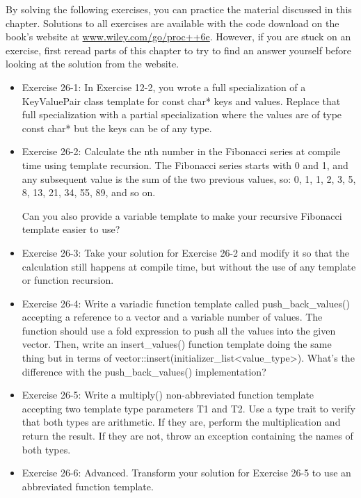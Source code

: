 By solving the following exercises, you can practice the material discussed in this chapter. Solutions to all exercises are available with the code download on the book’s website at \url{www.wiley.com/go/proc++6e}. However, if you are stuck on an exercise, first reread parts of this chapter to try to find an answer yourself before looking at the solution from the website.

\begin{itemize}
\item
Exercise 26-1: In Exercise 12-2, you wrote a full specialization of a KeyValuePair class template for const char* keys and values. Replace that full specialization with a partial specialization where the values are of type const char* but the keys can be of any type.

\item
Exercise 26-2: Calculate the nth number in the Fibonacci series at compile time using template recursion. The Fibonacci series starts with 0 and 1, and any subsequent value is the sum of the two previous values, so: 0, 1, 1, 2, 3, 5, 8, 13, 21, 34, 55, 89, and so on.

Can you also provide a variable template to make your recursive Fibonacci template easier to use?

\item
Exercise 26-3: Take your solution for Exercise 26-2 and modify it so that the calculation still happens at compile time, but without the use of any template or function recursion.

\item
Exercise 26-4: Write a variadic function template called push\_back\_values() accepting a reference to a vector and a variable number of values. The function should use a fold expression to push all the values into the given vector. Then, write an insert\_values() function template doing the same thing but in terms of vector::insert(initializer\_list<value\_type>). What’s the difference with the push\_back\_values() implementation?

\item
Exercise 26-5: Write a multiply() non-abbreviated function template accepting two template type parameters T1 and T2. Use a type trait to verify that both types are arithmetic. If they are, perform the multiplication and return the result. If they are not, throw an exception containing the names of both types.

\item
Exercise 26-6: Advanced. Transform your solution for Exercise 26-5 to use an abbreviated function template.
\end{itemize}





















